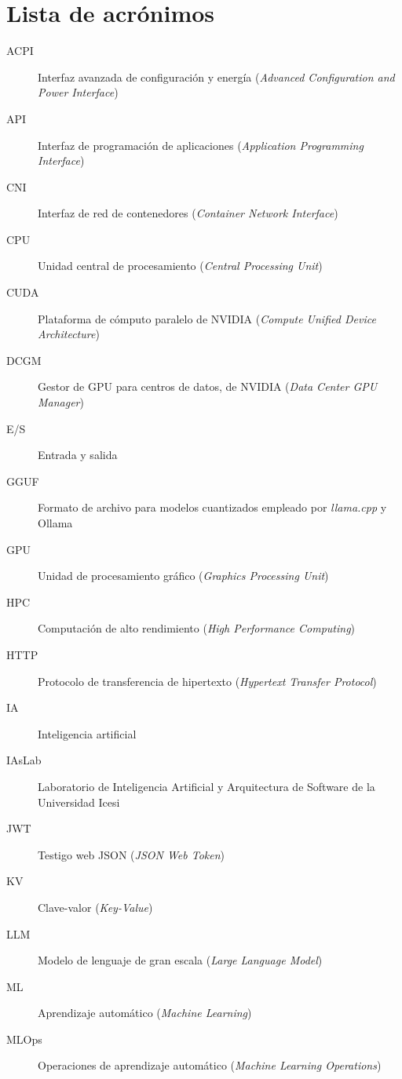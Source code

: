 \documentclass[letterpaper,11pt]{report}
\begin{document}
\chapter*{Lista de acrónimos}
\begin{description}
  \item[ACPI] Interfaz avanzada de configuración y energía (\emph{Advanced Configuration and Power Interface})
  \item[API] Interfaz de programación de aplicaciones (\emph{Application Programming Interface})
  \item[CNI] Interfaz de red de contenedores (\emph{Container Network Interface})
  \item[CPU] Unidad central de procesamiento (\emph{Central Processing Unit})
  \item[CUDA] Plataforma de cómputo paralelo de NVIDIA (\emph{Compute Unified Device Architecture})
  \item[DCGM] Gestor de GPU para centros de datos, de NVIDIA (\emph{Data Center GPU Manager})
  \item[E/S] Entrada y salida
  \item[GGUF] Formato de archivo para modelos cuantizados empleado por \emph{llama.cpp} y Ollama
  \item[GPU] Unidad de procesamiento gráfico (\emph{Graphics Processing Unit})
  \item[HPC] Computación de alto rendimiento (\emph{High Performance Computing})
  \item[HTTP] Protocolo de transferencia de hipertexto (\emph{Hypertext Transfer Protocol})
  \item[IA] Inteligencia artificial
  \item[IAsLab] Laboratorio de Inteligencia Artificial y Arquitectura de Software de la Universidad Icesi
  \item[JWT] Testigo web JSON (\emph{JSON Web Token})
  \item[KV] Clave-valor (\emph{Key-Value})
  \item[LLM] Modelo de lenguaje de gran escala (\emph{Large Language Model})
  \item[ML] Aprendizaje automático (\emph{Machine Learning})
  \item[MLOps] Operaciones de aprendizaje automático (\emph{Machine Learning Operations})

\end{description}
\end{document}
